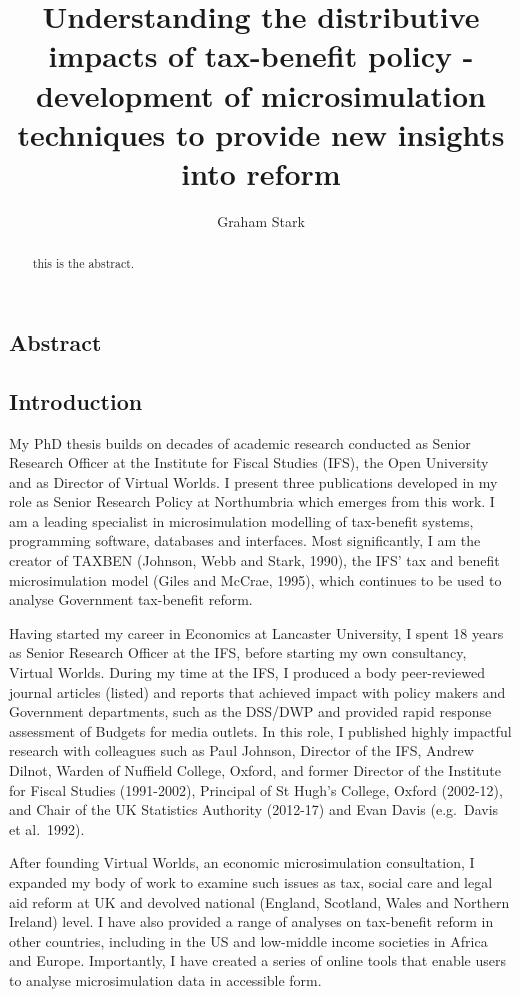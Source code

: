 \documentclass[
  letterpaper,
  DIV=11,
  numbers=noendperiod]{scrartcl}
\title{Understanding the distributive impacts of tax-benefit policy -
development of microsimulation techniques to provide new insights into
reform}
\author{Graham Stark}
\date{}
\begin{document}
\maketitle
\begin{abstract}
this is the abstract.
\end{abstract}

\subsection{Abstract}\label{abstract}

\subsection{Introduction}\label{introduction}

My PhD thesis builds on decades of academic research conducted as Senior
Research Officer at the Institute for Fiscal Studies (IFS), the Open
University and as Director of Virtual Worlds. I present three
publications developed in my role as Senior Research Policy at
Northumbria which emerges from this work. I am a leading specialist in
microsimulation modelling of tax-benefit systems, programming software,
databases and interfaces. Most significantly, I am the creator of TAXBEN
(Johnson, Webb and Stark, 1990), the IFS' tax and benefit
microsimulation model (Giles and McCrae, 1995), which continues to be
used to analyse Government tax-benefit reform.

Having started my career in Economics at Lancaster University, I spent
18 years as Senior Research Officer at the IFS, before starting my own
consultancy, Virtual Worlds. During my time at the IFS, I produced a
body peer-reviewed journal articles (listed) and reports that achieved
impact with policy makers and Government departments, such as the
DSS/DWP and provided rapid response assessment of Budgets for media
outlets. In this role, I published highly impactful research with
colleagues such as Paul Johnson, Director of the IFS, Andrew Dilnot,
Warden of Nuffield College, Oxford, and former Director of the Institute
for Fiscal Studies (1991-2002), Principal of St Hugh's College, Oxford
(2002-12), and Chair of the UK Statistics Authority (2012-17) and Evan
Davis (e.g.~Davis et al.~1992).

After founding Virtual Worlds, an economic microsimulation consultation,
I expanded my body of work to examine such issues as tax, social care
and legal aid reform at UK and devolved national (England, Scotland,
Wales and Northern Ireland) level. I have also provided a range of
analyses on tax-benefit reform in other countries, including in the US
and low-middle income societies in Africa and Europe. Importantly, I
have created a series of online tools that enable users to analyse
microsimulation data in accessible form.
\end{document}
